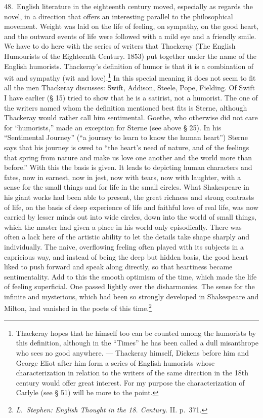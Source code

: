 \documentclass[12pt]{book}
\newcommand{\opage}[1]{\marginnote{\footnotesize\textit{[#1]}}}
\begin{document}
48.~English literature in the eighteenth century moved, especially as regards the novel, in a
direction that offers an interesting parallel to the philosophical movement. Weight was laid on the
life of feeling, on sympathy, on the good heart, and the outward events of life were followed with a
mild eye and a friendly smile. We have to do here with the series of writers that Thackeray (The
English Humourists of the Eighteenth Century. 1853) put together under the name of the English
humorists. Thackeray's definition of humor is that it is a combination of wit and sympathy (wit and
love).\footnote{Thackeray hopes that he himself too can be counted among the humorists by this
definition, although in the ``Times'' he has been called a dull misanthrope who sees no good
anywhere. --- Thackeray himself, Dickens before him and George Eliot after him form a series of
English humorists whose characterization in relation to the writers of the same direction in the
18th century would offer great interest. For my purpose the characterization of Carlyle (see § 51)
will be more to the point.} In this special \opage{159}meaning it does not seem to fit all the men
Thackeray discusses: Swift, Addison, Steele, Pope, Fielding. Of Swift I have earlier (§ 15) tried
to show that he is a satirist, not a humorist. The one of the writers named whom the definition
mentioned best fits is Sterne, although Thackeray would rather call him sentimental. Goethe, who
otherwise did not care for ``humorists,'' made an exception for Sterne (see above § 25). In his
``Sentimental Journey'' (``a journey to learn to know the human heart'') Sterne says that his journey
is owed to ``the heart's need of nature, and of the feelings that spring from nature and make us love
one another and the world more than before.'' With this the basis is given. It leads to depicting
human characters and fates, now in earnest, now in jest, now with tears, now with laughter, with a
sense for the small things and for life in the small circles. What Shakespeare in his giant works
had been able to present, the great richness and strong contrasts of life, on the basis of deep
experience of life and faithful love of real life, was now carried by lesser minds out into wide
circles, down into the world of small things, which the master had given a place in his world only
episodically. There was often a lack here of the artistic ability to let the details take shape
sharply and individually. The naive, overflowing feeling often played with its subjects in a
capricious way, and instead of being the deep but hidden basis, the good heart liked to push forward
and speak along directly, so that heartiness became sentimentality. Add to this the smooth optimism
of the time, which made the life of feeling superficial. One passed lightly over the disharmonies.
The sense for the infinite and mysterious, which had been so strongly developed in Shakespeare and
Milton, had vanished in the poets of this time.\footnote{\textit{L.~Stephen: English Thought in the
18. Century.} II. p.~371.}
\end{document}
